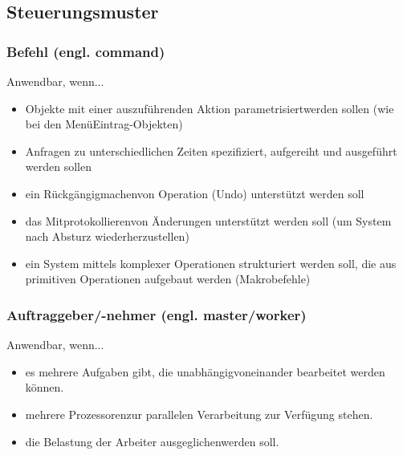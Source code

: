 \subsection{Steuerungsmuster}
\subsubsection{Befehl (engl. command)}
Anwendbar, wenn...
\begin{itemize}
    \item Objekte mit einer auszuführenden Aktion parametrisiertwerden sollen (wie bei den MenüEintrag-Objekten)
    \item Anfragen zu unterschiedlichen Zeiten spezifiziert, aufgereiht und ausgeführt werden sollen
    \item ein Rückgängigmachenvon Operation (Undo) unterstützt werden soll
    \item das Mitprotokollierenvon Änderungen unterstützt werden soll (um System nach Absturz wiederherzustellen)
    \item ein System mittels komplexer Operationen strukturiert werden soll, die aus primitiven Operationen aufgebaut werden (Makrobefehle)
\end{itemize}

\subsubsection{Auftraggeber/-nehmer (engl. master/worker)}
Anwendbar, wenn...
\begin{itemize}
    \item es mehrere Aufgaben gibt, die unabhängigvoneinander bearbeitet werden können.
    \item mehrere Prozessorenzur parallelen Verarbeitung zur Verfügung stehen.
    \item die Belastung der Arbeiter ausgeglichenwerden soll.
\end{itemize}


